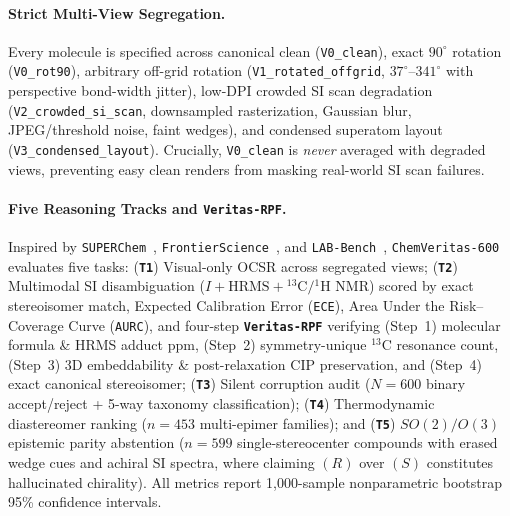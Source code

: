 \documentclass[10pt,twocolumn]{article}
\begin{document}
\paragraph{Strict Multi-View Segregation.} Every molecule is specified across canonical clean (\texttt{V0\_clean}), exact $90^\circ$ rotation (\texttt{V0\_rot90}), arbitrary off-grid rotation (\texttt{V1\_rotated\_offgrid}, $37^\circ$--$341^\circ$ with perspective bond-width jitter), low-DPI crowded SI scan degradation (\texttt{V2\_crowded\_si\_scan}, downsampled rasterization, Gaussian blur, JPEG/threshold noise, faint wedges), and condensed superatom layout (\texttt{V3\_condensed\_layout}). Crucially, \texttt{V0\_clean} is \emph{never} averaged with degraded views, preventing easy clean renders from masking real-world SI scan failures.

\paragraph{Five Reasoning Tracks and \texttt{Veritas-RPF}.} Inspired by \texttt{SUPERChem}~\cite{Zhao2025SUPERChem}, \texttt{FrontierScience}~\cite{Wang2026FrontierScience}, and \texttt{LAB-Bench}~\cite{Laurent2024LABBench}, \texttt{ChemVeritas-600} evaluates five tasks:
(\textbf{\texttt{T1}}) Visual-only OCSR across segregated views;
(\textbf{\texttt{T2}}) Multimodal SI disambiguation ($I + \text{HRMS} + {}^{13}\text{C}/{}^{1}\text{H}$ NMR) scored by exact stereoisomer match, Expected Calibration Error (\texttt{ECE}), Area Under the Risk--Coverage Curve (\texttt{AURC}), and four-step \textbf{\texttt{Veritas-RPF}} verifying (Step~1) molecular formula \& HRMS adduct ppm, (Step~2) symmetry-unique $^{13}\text{C}$ resonance count, (Step~3) 3D embeddability \& post-relaxation CIP preservation, and (Step~4) exact canonical stereoisomer;
(\textbf{\texttt{T3}}) Silent corruption audit ($N=600$ binary accept/reject + 5-way taxonomy classification);
(\textbf{\texttt{T4}}) Thermodynamic diastereomer ranking ($n=453$ multi-epimer families); and
(\textbf{\texttt{T5}}) $SO(2)/O(3)$ epistemic parity abstention ($n=599$ single-stereocenter compounds with erased wedge cues and achiral SI spectra, where claiming $(R)$ over $(S)$ constitutes hallucinated chirality). All metrics report 1,000-sample nonparametric bootstrap 95\% confidence intervals.
\end{document}
